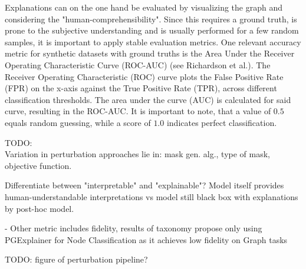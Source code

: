 Explanations can on the one hand be evaluated by visualizing the graph and considering the "human-comprehensibility". Since this requires a ground truth, is prone to the subjective understanding and is usually performed for a few random samples, it is important to apply stable evaluation metrics. One relevant accuracy metric for synthetic datasets with ground truths is the Area Under the Receiver Operating Characteristic Curve (ROC-AUC) (see Richardson et al.\cite{RICHARDSON2024100994}). The Receiver Operating Characteristic (ROC) curve plots the False Positive Rate (FPR) on the x-axis against the True Positive Rate (TPR), across different classification thresholds. The area under the curve (AUC) is calculated for said curve, resulting in the ROC-AUC. It is important to note, that a value of $0.5$ equals random guessing, while a score of $1.0$ indicates perfect classification. \bigskip

TODO: \\
Variation in perturbation approaches lie in: mask gen. alg., type of mask, objective function.

Differentiate between "interpretable" and "explainable"? Model itself provides human-understandable interpretations vs model still black box with explanations by post-hoc model.

- Other metric includes fidelity, results of taxonomy propose only using PGExplainer for Node Classification as it achieves low fidelity on Graph tasks

TODO: figure of perturbation pipeline?

